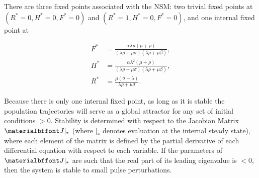 \documentclass{pnastwo}
\begin{document}
\begin{article}


There are three fixed points associated with the NSM: two trivial fixed points at $(R^*=0,H^*=0,F^*=0)$ and $(R^*=1,H^*=0,F^*=0)$, and one internal fixed point at

\begin{equation} \label{eq:ss}
\begin{aligned}
F^* &= \frac{\alpha  \lambda  \mu  (\mu +\rho )}{(\lambda  \rho +\mu  \sigma ) (\lambda  \rho +\mu  \beta)}, \\
H^* &= \frac{\alpha  \lambda ^2 (\mu +\rho )}{(\lambda  \rho +\mu  \sigma ) (\lambda  \rho +\mu  \beta)}, \\
R^* &= \frac{\mu  (\sigma -\lambda )}{\lambda  \rho +\mu  \sigma }.
\end{aligned}
\end{equation}



\noindent Because there is only one internal fixed point, as long as it is stable the population trajectories will serve as a global attractor for any set of initial conditions $>0$.
Stability is determined with respect to the Jacobian Matrix $\bf J|_*$ (where $|_*$ denotes evaluation at the internal steady state), where each element of the matrix is defined by the partial derivative of each differential equation with respect to each variable.
If the parameters of $\bf J|_*$ are such that the real part of its leading eigenvalue is $<0$, then the system is stable to small pulse perturbations. 



\end{article}
\end{document}
